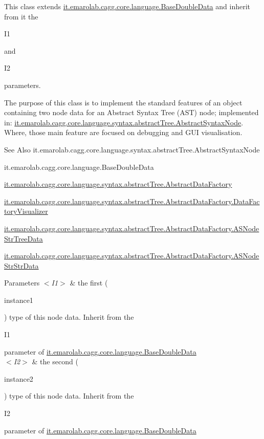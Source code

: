 This class extends \hyperlink{}{it.\-emarolab.\-cagg.\-core.\-language.\-Base\-Double\-Data} and inherit from it the
\begin{DoxyCode}
I1 
\end{DoxyCode}
 and
\begin{DoxyCode}
I2 
\end{DoxyCode}
 parameters.\par
 The purpose of this class is to implement the standard features of an object containing two node data for an Abstract Syntax Tree (A\-S\-T) node; implemented in\-: \hyperlink{}{it.\-emarolab.\-cagg.\-core.\-language.\-syntax.\-abstract\-Tree.\-Abstract\-Syntax\-Node}. Where, those main feature are focused on debugging and G\-U\-I visualisation. 

\begin{DoxySeeAlso}{See Also}
it.\-emarolab.\-cagg.\-core.\-language.\-syntax.\-abstract\-Tree.\-Abstract\-Syntax\-Node 

it.\-emarolab.\-cagg.\-core.\-language.\-Base\-Double\-Data 

\hyperlink{classit_1_1emarolab_1_1cagg_1_1core_1_1language_1_1syntax_1_1abstractTree_1_1AbstractDataFactory}{it.\-emarolab.\-cagg.\-core.\-language.\-syntax.\-abstract\-Tree.\-Abstract\-Data\-Factory} 

\hyperlink{classit_1_1emarolab_1_1cagg_1_1core_1_1language_1_1syntax_1_1abstractTree_1_1AbstractDataFactory_1_1DataFactoryVisualizer}{it.\-emarolab.\-cagg.\-core.\-language.\-syntax.\-abstract\-Tree.\-Abstract\-Data\-Factory.\-Data\-Factory\-Visualizer} 

\hyperlink{classit_1_1emarolab_1_1cagg_1_1core_1_1language_1_1syntax_1_1abstractTree_1_1AbstractDataFactory_1_1ASNodeStrTreeData}{it.\-emarolab.\-cagg.\-core.\-language.\-syntax.\-abstract\-Tree.\-Abstract\-Data\-Factory.\-A\-S\-Node\-Str\-Tree\-Data} 

\hyperlink{classit_1_1emarolab_1_1cagg_1_1core_1_1language_1_1syntax_1_1abstractTree_1_1AbstractDataFactory_1_1ASNodeStrStrData}{it.\-emarolab.\-cagg.\-core.\-language.\-syntax.\-abstract\-Tree.\-Abstract\-Data\-Factory.\-A\-S\-Node\-Str\-Str\-Data}
\end{DoxySeeAlso}

\begin{DoxyParams}{Parameters}
{\em $<$\-I1$>$} & the first (
\begin{DoxyCode}
instance1 
\end{DoxyCode}
 ) type of this node data. Inherit from the
\begin{DoxyCode}
I1 
\end{DoxyCode}
 parameter of \hyperlink{}{it.\-emarolab.\-cagg.\-core.\-language.\-Base\-Double\-Data} \\
\hline
{\em $<$\-I2$>$} & the second (
\begin{DoxyCode}
instance2 
\end{DoxyCode}
 ) type of this node data. Inherit from the
\begin{DoxyCode}
I2 
\end{DoxyCode}
 parameter of \hyperlink{}{it.\-emarolab.\-cagg.\-core.\-language.\-Base\-Double\-Data} \\
\hline
\end{DoxyParams}


